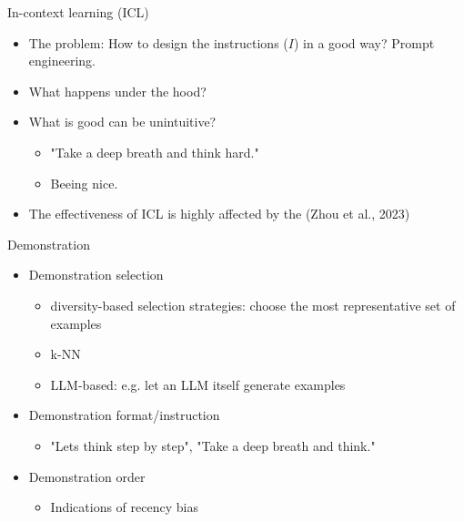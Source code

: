 \documentclass[10pt]{beamer}
\begin{document}
\begin{frame}{In-context learning (ICL)}

\begin{itemize}
\item The problem: How to design the instructions ($I$) in a good way? Prompt engineering.
\pause
\item What happens under the hood? 
\item What is good can be unintuitive?
\begin{itemize}
\item "Take a deep breath and think hard." %
\item Beeing nice. %
\end{itemize}
\pause
\item The effectiveness of ICL is highly affected by the  (Zhou et al., 2023) %
\end{itemize}

\end{frame}


\begin{frame}{Demonstration}

\begin{itemize}
\item Demonstration selection
\begin{itemize}
\item diversity-based selection strategies: choose the most representative set of examples
\item k-NN
\item LLM-based: e.g. let an LLM itself generate examples
\end{itemize}
\pause
\item Demonstration format/instruction
\begin{itemize}
\item "Lets think step by step", "Take a deep breath and think."
\end{itemize}
\pause
\item Demonstration order
\begin{itemize}
\item Indications of recency bias
\end{itemize}
\end{itemize}


\end{frame}
\end{document}
